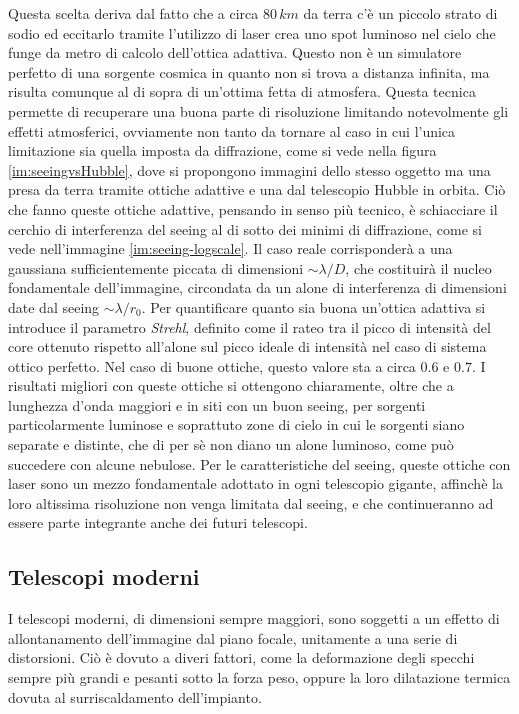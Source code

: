Questa scelta deriva dal fatto che a circa $80\, km$ da terra c'è un piccolo strato di sodio ed eccitarlo tramite l'utilizzo di laser crea uno spot luminoso nel cielo che funge da metro di calcolo dell'ottica adattiva. Questo non è un simulatore perfetto di una sorgente cosmica in quanto non si trova a distanza infinita, ma risulta comunque al di sopra di un'ottima fetta di atmosfera. Questa tecnica permette di recuperare una buona parte di risoluzione limitando notevolmente gli effetti atmosferici, ovviamente non tanto da tornare al caso in cui l'unica limitazione sia quella imposta da diffrazione, come si vede nella figura \ref{im:seeingvsHubble}, dove si propongono immagini dello stesso oggetto ma una presa da terra tramite ottiche adattive e una dal telescopio Hubble in orbita. Ciò che fanno queste ottiche adattive, pensando in senso più tecnico, è schiacciare il cerchio di interferenza del seeing al di sotto dei minimi di diffrazione, come si vede nell'immagine \ref{im:seeing-logscale}. Il caso reale corrisponderà a una gaussiana sufficientemente piccata di dimensioni $\sim \lambda/D$, che costituirà il nucleo fondamentale dell'immagine, circondata da un alone di interferenza di dimensioni date dal seeing $\sim \lambda/r_0$. Per quantificare quanto sia buona un'ottica adattiva si introduce il parametro \textit{Strehl}, definito come il rateo tra il picco di intensità del core ottenuto rispetto all'alone sul picco ideale di intensità nel caso di sistema ottico perfetto. Nel caso di buone ottiche, questo valore sta a circa $0.6$ e $0.7$. I risultati migliori con queste ottiche si ottengono chiaramente, oltre che a lunghezza d'onda maggiori e in siti con un buon seeing, per sorgenti particolarmente luminose e soprattuto zone di cielo in cui le sorgenti siano separate e distinte, che di per sè non diano un alone luminoso, come può succedere con alcune nebulose. Per le caratteristiche del seeing, queste ottiche con laser sono un mezzo fondamentale adottato in ogni telescopio gigante, affinchè la loro altissima risoluzione non venga limitata dal seeing, e che continueranno ad essere parte integrante anche dei futuri telescopi.

\subsection*{Telescopi moderni}

I telescopi moderni, di dimensioni sempre maggiori, sono soggetti a un effetto di allontanamento dell'immagine dal piano focale, unitamente a una serie di distorsioni. Ciò è dovuto a diveri fattori, come la deformazione degli specchi sempre più grandi e pesanti sotto la forza peso, oppure la loro dilatazione termica dovuta al surriscaldamento dell'impianto.